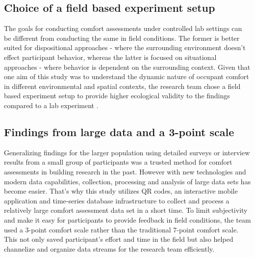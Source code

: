 
\subsection{Choice of a field based experiment setup}
The goals for conducting comfort assessments under controlled lab settings can be different from conducting the same in field conditions. The former is better suited for dispositional approaches - where the surrounding environment doesn't effect participant behavior, whereas the latter is focused on situational approaches - where behavior is dependent on the surrounding context.
Given that one aim of this study was to understand the dynamic nature of occupant comfort in different environmental and spatial contexts, the research team chose a field based experiment setup to provide higher ecological validity to the findings compared to a lab experiment \cite{andrade2018internal}.           


\subsection{Findings from large data and a 3-point scale}

Generalizing findings for the larger population using detailed surveys or interview results from a small group of participants was a trusted method for comfort assessments in building research in the past. However with new technologies and modern data capabilities, collection, processing and analysis of large data sets has become easier. That's why this study utilizes QR codes, an interactive mobile application and time-series database infrastructure to collect and process a relatively large comfort assessment data set in a short time. To limit subjectivity and make it easy for participants to provide feedback in field conditions, the team used a 3-point comfort scale rather than the traditional 7-point comfort scale. This not only saved participant's effort and time in the field but also helped channelize and organize data streams for the research team efficiently.





